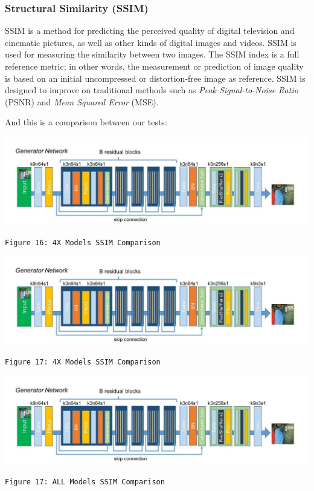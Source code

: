 \documentclass[12pt]{article}
\begin{document}
			\subsubsection{Structural Similarity (SSIM)}
				\textsc{SSIM} is a method for predicting the perceived quality of digital television and cinematic pictures, as well as other kinds of digital images and videos. SSIM is used for measuring the similarity between two images. The SSIM index is a full reference metric; in other words, the measurement or prediction of image quality is based on an initial uncompressed or distortion-free image as reference. SSIM is designed to improve on traditional methods such as \textit{Peak Signal-to-Noise Ratio} (PSNR) and \textit{Mean Squared Error} (MSE).
				
				And this is a comparison between our tests:
				\begin{center}
					\vspace{0.1in}
					\includegraphics[width=6in]{Images/Generator.jpeg}
				
					\texttt{Figure 16: 4X Models SSIM Comparison}
					\vspace{0.1in}
				\end{center}
				\begin{center}
					\vspace{0.1in}
					\includegraphics[width=6in]{Images/Generator.jpeg}
				
					\texttt{Figure 17: 4X Models SSIM Comparison}
					\vspace{0.1in}
				\end{center}
				\begin{center}
					\vspace{0.1in}
					\includegraphics[width=6in]{Images/Generator.jpeg}
				
					\texttt{Figure 17: ALL Models SSIM Comparison}
					\vspace{0.1in}
				\end{center}
	
\end{document}
